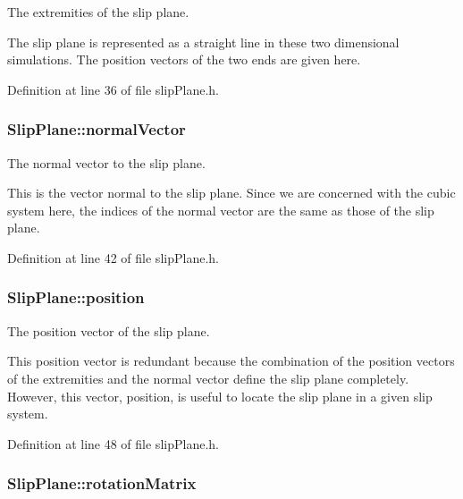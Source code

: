 The extremities of the slip plane. 

The slip plane is represented as a straight line in these two dimensional simulations. The position vectors of the two ends are given here. 

Definition at line 36 of file slip\-Plane.\-h.

\hypertarget{classSlipPlane_aad33ce7b595e5fc55aefe51c7b0957f2}{
\subsubsection[{normal\-Vector}]{ Slip\-Plane\-::normal\-Vector\hspace{0.3cm}{\ttfamily [protected]}}}\label{db/d25/classSlipPlane_aad33ce7b595e5fc55aefe51c7b0957f2}


The normal vector to the slip plane. 

This is the vector normal to the slip plane. Since we are concerned with the cubic system here, the indices of the normal vector are the same as those of the slip plane. 

Definition at line 42 of file slip\-Plane.\-h.

\hypertarget{classSlipPlane_ac2ac59e22e9638a990c9e45aaa096d9a}{
\subsubsection[{position}]{ Slip\-Plane\-::position\hspace{0.3cm}{\ttfamily [protected]}}}\label{db/d25/classSlipPlane_ac2ac59e22e9638a990c9e45aaa096d9a}


The position vector of the slip plane. 

This position vector is redundant because the combination of the position vectors of the extremities and the normal vector define the slip plane completely. However, this vector, position, is useful to locate the slip plane in a given slip system. 

Definition at line 48 of file slip\-Plane.\-h.

\hypertarget{classSlipPlane_a1aa5aacccb6bb03d163a95251aa10d6c}{
\subsubsection[{rotation\-Matrix}]{ Slip\-Plane\-::rotation\-Matrix\hspace{0.3cm}{\ttfamily [protected]}}}\label{db/d25/classSlipPlane_a1aa5aacccb6bb03d163a95251aa10d6c}


